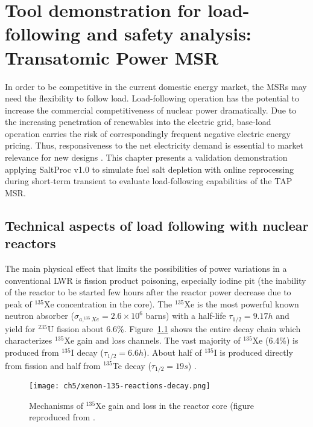\chapter{Tool demonstration for load-following and safety analysis: 
Transatomic Power MSR}
In order to be competitive in the current domestic energy market, the 
\glspl{MSR} may need the flexibility to follow load. 
Load-following operation has the potential to increase the commercial 
competitiveness of nuclear power dramatically. Due to the increasing 
penetration of renewables into the electric grid, base-load operation carries 
the risk of correspondingly frequent negative electric energy pricing. Thus, 
responsiveness to the net electricity demand is essential to market relevance 
for new designs \cite{energy_information_administration_u.s._2016}.
This chapter presents a validation demonstration applying SaltProc v1.0 to 
simulate fuel salt depletion with online reprocessing during short-term 
transient to evaluate load-following capabilities of the \gls{TAP} \gls{MSR}.

\section{Technical aspects of load following with nuclear reactors}

The main physical effect that limits the possibilities of power variations in 
a conventional \gls{LWR} is fission product poisoning, especially iodine pit 
(the inability of the reactor to be started few hours after the reactor power 
decrease due to peak of $^{135}$Xe concentration in the core). The 
$^{135}$Xe is the most powerful known neutron absorber 
($\sigma_{a,^{135}Xe}=2.6\times10^6$ barns) with a half-life 
$\tau_{1/2}=9.17h$ and yield for $^{235}$U fission about 6.6\%. 
Figure~\ref{fig:xe-reaction-chain} shows the entire decay chain which 
characterizes $^{135}$Xe gain and loss channels. The vast 
majority of $^{135}$Xe (6.4\%) is produced from $^{135}$I decay 
($\tau_{1/2}=6.6h$). About half of $^{135}$I is produced directly from fission 
and half from $^{135}$Te decay ($\tau_{1/2}=19s$) 
\cite{nuclear_power_production_2020}.
\begin{figure}[hbp!] %
	\centering
	\texttt{[image: ch5/xenon-135-reactions-decay.png]}
	\caption{Mechanisms of $^{135}$Xe gain and loss in the reactor core 
		(figure reproduced from \cite{nuclear_power_production_2020}.}
	\label{fig:xe-reaction-chain}
\end{figure}

